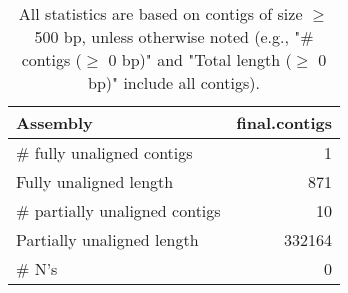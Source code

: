 \documentclass[12pt,a4paper]{article}
\begin{document}
\begin{table}[ht]
\begin{center}
\caption{All statistics are based on contigs of size $\geq$ 500 bp, unless otherwise noted (e.g., "\# contigs ($\geq$ 0 bp)" and "Total length ($\geq$ 0 bp)" include all contigs).}
\begin{tabular}{|l*{1}{|r}|}
\hline
Assembly & final.contigs \\ \hline
\# fully unaligned contigs & 1 \\ \hline
Fully unaligned length & 871 \\ \hline
\# partially unaligned contigs & 10 \\ \hline
Partially unaligned length & 332164 \\ \hline
\# N's & 0 \\ \hline
\end{tabular}
\end{center}
\end{table}
\end{document}
